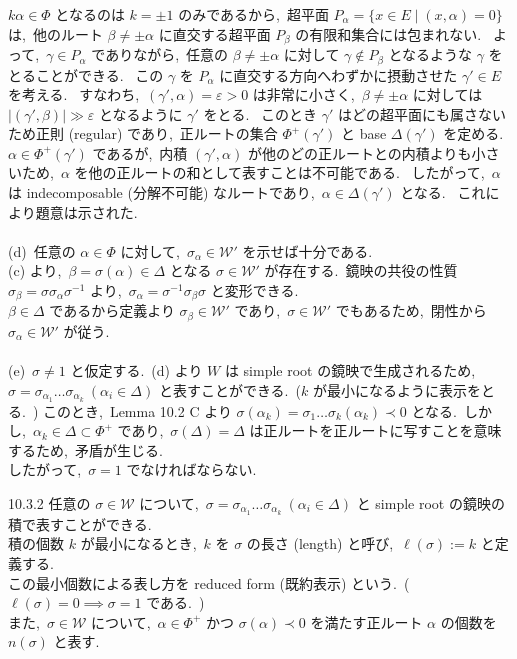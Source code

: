 \documentclass[uplatex,dvipdfmx]{jsarticle}
\begin{document}
\begin{myproof}
    $k\alpha \in \Phi$ となるのは $k = \pm 1$ のみであるから,~超平面 $P_\alpha = \{ x \in E \mid (x, \alpha) = 0 \}$ は,~他のルート $\beta \neq \pm \alpha$ に直交する超平面 $P_\beta$ の有限和集合には包まれない.~
    よって,~$\gamma \in P_\alpha$ でありながら,~任意の $\beta \neq \pm \alpha$ に対して $\gamma \notin P_\beta$ となるような $\gamma$ をとることができる.~
    この $\gamma$ を $P_\alpha$ に直交する方向へわずかに摂動させた $\gamma' \in E$ を考える.~
    すなわち,~$(\gamma', \alpha) = \varepsilon > 0$ は非常に小さく,~$\beta \neq \pm \alpha$ に対しては $|(\gamma', \beta)| \gg \varepsilon$ となるように $\gamma'$ をとる.~
    このとき $\gamma'$ はどの超平面にも属さないため正則 (regular) であり,~正ルートの集合 $\Phi^+(\gamma')$ と base $\Delta(\gamma')$ を定める.~
    $\alpha \in \Phi^+(\gamma')$ であるが,~内積 $(\gamma', \alpha)$ が他のどの正ルートとの内積よりも小さいため,~$\alpha$ を他の正ルートの和として表すことは不可能である.~
    したがって,~$\alpha$ は indecomposable (分解不可能) なルートであり,~$\alpha \in \Delta(\gamma')$ となる.~
    これにより題意は示された.~\\\\
    (d)~任意の $\alpha \in \Phi$ に対して,~$\sigma_\alpha \in \mathcal{W}'$ を示せば十分である.~\\
    (c) より,~$\beta = \sigma(\alpha) \in \Delta$ となる $\sigma \in \mathcal{W}'$ が存在する.~鏡映の共役の性質 $\sigma_\beta = \sigma \sigma_\alpha \sigma^{-1}$ より,~$\sigma_\alpha = \sigma^{-1} \sigma_\beta \sigma$ と変形できる.~\\
    $\beta \in \Delta$ であるから定義より $\sigma_\beta \in \mathcal{W}'$ であり,~$\sigma \in \mathcal{W}'$ でもあるため,~閉性から $\sigma_\alpha \in \mathcal{W}'$ が従う.~\\\\
    (e)~$\sigma \neq 1$ と仮定する.~(d) より $W$ は simple root の鏡映で生成されるため,~$\sigma = \sigma_{\alpha_1} \dots \sigma_{\alpha_k} \ (\alpha_i \in \Delta)$ と表すことができる.~($k$ が最小になるように表示をとる.~)
    このとき,~Lemma 10.2 C より $\sigma(\alpha_k) = \sigma_1 \dots \sigma_k(\alpha_k) \prec 0$ となる.~しかし,~$\alpha_k \in \Delta \subset \Phi^+$ であり,~$\sigma(\Delta) = \Delta$ は正ルートを正ルートに写すことを意味するため,~矛盾が生じる.~\\
    したがって,~$\sigma = 1$ でなければならない.~
\end{myproof}
\begin{mydef}{10.3.2}
    任意の $\sigma \in \mathcal{W}$ について,~$\sigma = \sigma_{\alpha_1} \dots \sigma_{\alpha_k} \ (\alpha_i \in \Delta)$ と simple root の鏡映の積で表すことができる.~\\
    積の個数 $k$ が最小になるとき,~$k$ を $\sigma$ の長さ (length) と呼び,~$\ell(\sigma) := k$ と定義する.~\\
    この最小個数による表し方を reduced form (既約表示) という.~($\ell(\sigma) = 0 \implies \sigma = 1$ である.~)\\
    また,~$\sigma \in \mathcal{W}$ について,~$\alpha \in \Phi^+$ かつ $\sigma(\alpha) \prec 0$ を満たす正ルート $\alpha$ の個数を $n(\sigma)$ と表す.~
\end{mydef}
\end{document}
